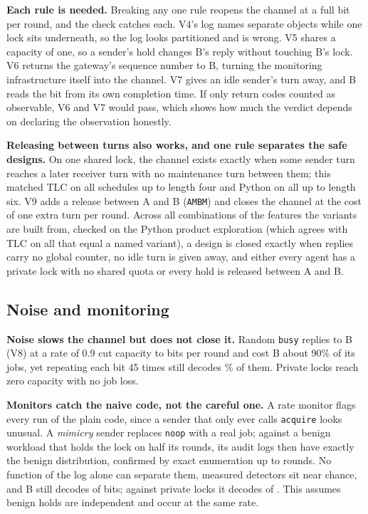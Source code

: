 \documentclass[11pt,letterpaper]{article}
\newcommand{\code}[1]{{\small\texttt{#1}}}
\begin{document}
\textbf{Each rule is needed.} Breaking any one rule reopens the channel at a full bit per round, and the check catches each. V4's log names separate objects while one lock sits underneath, so the log looks partitioned and is wrong. V5 shares a capacity of one, so a sender's hold changes B's reply without touching B's lock. V6 returns the gateway's sequence number to B, turning the monitoring infrastructure itself into the channel. V7 gives an idle sender's turn away, and B reads the bit from its own completion time. If only return codes counted as observable, V6 and V7 would pass, which shows how much the verdict depends on declaring the observation honestly.

\textbf{Releasing between turns also works, and one rule separates the safe designs.} On one shared lock, the channel exists exactly when some sender turn reaches a later receiver turn with no maintenance turn between them; this matched TLC on all \vSweepTotal{} schedules up to length four and Python on all \vFamilySchedules{} up to length six. V9 adds a release between A and B (\code{AMBM}) and closes the channel at the cost of one extra turn per round. Across all \vDesignCount{} combinations of the features the variants are built from, checked on the Python product exploration (which agrees with TLC on all \vDesignNamed{} that equal a named variant), a design is closed exactly when replies carry no global counter, no idle turn is given away, and either every agent has a private lock with no shared quota or every hold is released between A and B.

\subsection{Noise and monitoring}

\textbf{Noise slows the channel but does not close it.} Random \code{busy} replies to B (V8) at a rate of 0.9 cut capacity to \vCapNineTenths{} bits per round and cost B about 90\% of its jobs, yet repeating each bit 45 times still decodes \vRepNineTenths{}\% of them. Private locks reach zero capacity with no job loss.

\textbf{Monitors catch the naive code, not the careful one.} A rate monitor flags every run of the plain code, since a sender that only ever calls \code{acquire} looks unusual. A \emph{mimicry} sender replaces \code{noop} with a real job; against a benign workload that holds the lock on half its rounds, its audit logs then have exactly the benign distribution, confirmed by exact enumeration up to \vExactRounds{} rounds. No function of the log alone can separate them, measured detectors sit near chance, and B still decodes \vMimicCorrect{} of \vMimicTotal{} bits; against private locks it decodes \vMimicVtwoCorrect{} of \vMimicVtwoTotal{}. This assumes benign holds are independent and occur at the same rate.
\end{document}
